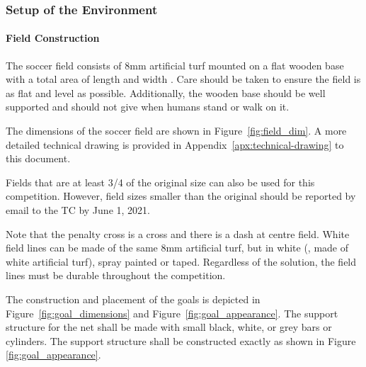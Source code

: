\subsubsection{Setup of the Environment}
\paragraph{Field Construction}
\label{sec:field_dim}

The soccer field consists of 8mm artificial turf mounted on a flat wooden base with a total area of length \TotalLength and width \TotalWidth.  Care should be taken to ensure the field is as flat and level as possible.  Additionally, the wooden base should be well supported and should not give when humans stand or walk on it.

The dimensions of the soccer field are shown in Figure~\ref{fig:field_dim}.
A more detailed technical drawing is provided in Appendix~\ref{apx:technical-drawing} to this document.

Fields that are at least 3/4 of the original size can also be used for this competition. However, field sizes smaller than the original should be reported by email to the TC by June 1, 2021.
 
Note that the penalty cross is a cross and there is a dash at centre field. White field lines can be made of the same 8mm artificial turf, but in white (\ie, made of white artificial turf), spray painted or taped. Regardless of the solution, the field lines must be durable throughout the competition.

The construction and placement of the goals is depicted in Figure~\ref{fig:goal_dimensions} and Figure~\ref{fig:goal_appearance}. The support structure for the net shall be made with small black, white, or grey bars or cylinders. The support structure shall be constructed exactly as shown in Figure \ref{fig:goal_appearance}.


